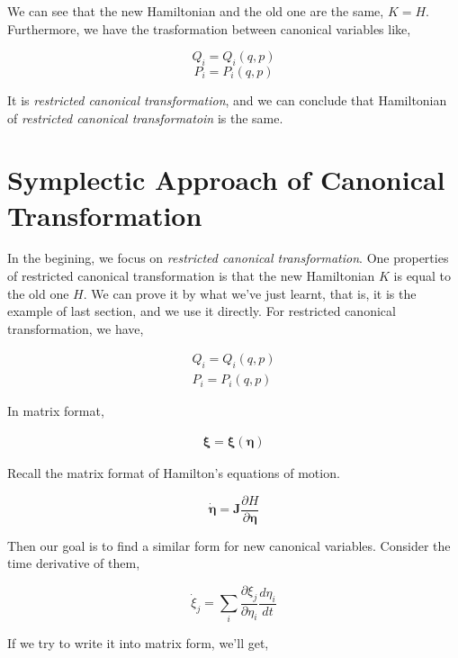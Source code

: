 \documentclass[12pt]{article}
\numberwithin{equation}{section}
\begin{document}
We can see that the new Hamiltonian and the old one are the same, $K = H$. Furthermore, we have the trasformation between canonical variables like,

\begin{center}
    \[ Q_i = Q_i(q, p) \]
    \[ P_i = P_i(q, p) \]
\end{center}

It is \textit{restricted canonical transformation}, and we can conclude that Hamiltonian of \textit{restricted canonical transformatoin} is the same.

\section{Symplectic Approach of Canonical Transformation}

In the begining, we focus on \textit{restricted canonical transformation}. One properties of restricted canonical transformation is that the new Hamiltonian $K$ is equal to the old one $H$. We can prove it by what we've just learnt, that is, it is the example of last section, and we use it directly. For restricted canonical transformation, we have,

\begin{equation}
    \begin{array}{l}
        Q_i = Q_i(q, p)\\
        P_i = P_i(q, p)
    \end{array}
\end{equation}

In matrix format,

\begin{equation}
    \begin{array}{l}
        \pmb{\xi} = \pmb{\xi}(\pmb{\eta})
    \end{array}
\end{equation}

Recall the matrix format of Hamilton's equations of motion.

\begin{equation}
    \dot{\pmb{\eta}} = \pmb{J}\frac{\partial H}{\partial \pmb{\eta}}
\end{equation}

Then our goal is to find a similar form for new canonical variables. Consider the time derivative of them,

\[
    \dot{\xi}_j = \sum_{i}{\frac{\partial \xi_j}{\partial \eta_i}\frac{d \eta_i}{d t}} 
\]

If we try to write it into matrix form, we'll get,
\end{document}
